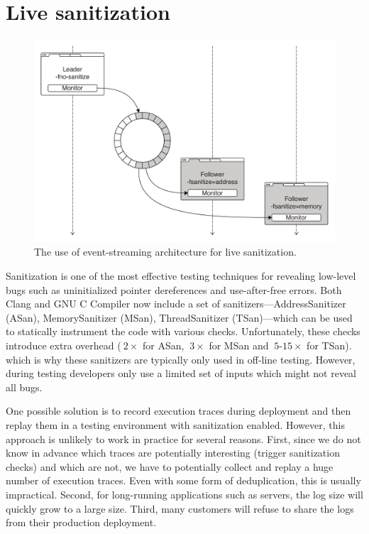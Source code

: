 \section{Live sanitization}
\label{sec:sanitization}

\begin{figure}[t]
  \begin{center}
    \includegraphics[width=0.75\columnwidth]{applications/figures/live-sanitization}
    \caption{The use of event-streaming architecture for live sanitization.}
    \label{fig:live-sanitization}
  \end{center}
\end{figure}

Sanitization is one of the most effective testing techniques for
revealing low-level bugs such as uninitialized pointer dereferences and
use-after-free errors.  Both Clang and GNU C Compiler now include a set
of sanitizers---AddressSanitizer (ASan), MemorySanitizer (MSan),
ThreadSanitizer (TSan)---which can be used to statically instrument
the code with various checks.  Unfortunately, these checks introduce
extra overhead (\eg $~2\times$ for ASan, $~3\times$ for MSan and
$~5$-$15\times$ for TSan).  which is why these sanitizers are typically
only used in off-line testing. However, during testing developers only
use a limited set of inputs which might not reveal all bugs.

One possible solution is to record execution traces during deployment
and then replay them in a testing environment with sanitization
enabled. However, this approach is unlikely to work in practice for
several reasons. First, since we do not know in advance which traces
are potentially interesting (\eg trigger sanitization checks) and
which are not, we have to potentially collect and replay a huge number
of execution traces. Even with some form of deduplication, this is
usually impractical. Second, for long-running applications such as
servers, the log size will quickly grow to a large size. Third, many
customers will refuse to share the logs from their production
deployment.

